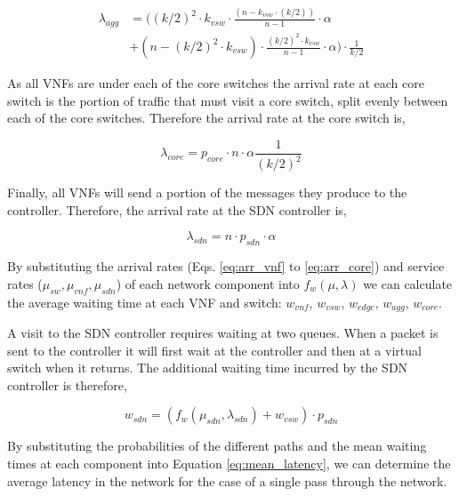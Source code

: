 \begin{equation}
\label{eq:arr_agg}
\begin{split}
\lambda_{agg} &= \Big((k/2)^2 \cdot k_{vsw} \cdot \frac{(n - k_{vsw} \cdot (k/2))}{n - 1} \cdot \alpha\\
			  &+ (n - (k/2)^2 \cdot k_{vsw}) \cdot \frac{(k/2)^2 \cdot k_{vsw}}{n - 1} \cdot \alpha\Big) \cdot \frac{1}{k/2}
\end{split}
\end{equation}

As all VNFs are under each of the core switches the arrival rate at each core switch is the portion of traffic that must visit a core switch, split evenly between each of the core switches. Therefore the arrival rate at the core switch is,

\begin{equation}
\label{eq:arr_core}
\lambda_{core} = p_{core} \cdot n \cdot \alpha \frac{1}{(k / 2)^2}
\end{equation}

Finally, all VNFs will send a portion of the messages they produce to the controller. Therefore, the arrival rate at the SDN controller is,

\begin{equation}
\label{eq:arr_sdn}
\lambda_{sdn} = n \cdot p_{sdn} \cdot \alpha
\end{equation}

By substituting the arrival rates (Eqs. \ref{eq:arr_vnf} to \ref{eq:arr_core}) and service rates ($\mu_{sw}, \mu_{vnf}, \mu_{sdn}$) of each network component into $f_w(\mu, \lambda)$ we can calculate the average waiting time at each VNF and switch: $w_{vnf}$, $w_{vsw}$, $w_{edge}$, $w_{agg}$, $w_{core}$.

A visit to the SDN controller requires waiting at two queues. When a packet is sent to the controller it will first wait at the controller and then at a virtual switch when it returns. The additional waiting time incurred by the SDN controller is therefore,

\begin{equation}
\label{eq:wait_sdn}
w_{sdn} = (f_w(\mu_{sdn}, \lambda_{sdn}) + w_{vsw}) \cdot p_{sdn}
\end{equation}

By substituting the probabilities of the different paths and the mean waiting times at each component into Equation \ref{eq:mean_latency}, we can determine the average latency in the network for the case of a single pass through the network.

